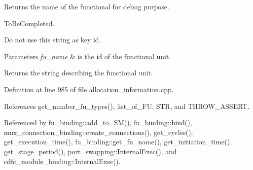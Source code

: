 Returns the name of the functional for debug purpose. 

To\+Be\+Completed.

Do not use this string as key id. 
\begin{DoxyParams}{Parameters}
{\em fu\+\_\+name} & is the id of the functional unit. \\
\hline
\end{DoxyParams}
\begin{DoxyReturn}{Returns}
the string describing the functional unit. 
\end{DoxyReturn}


Definition at line 985 of file allocation\+\_\+information.\+cpp.



References get\+\_\+number\+\_\+fu\+\_\+types(), list\+\_\+of\+\_\+\+FU, S\+TR, and T\+H\+R\+O\+W\+\_\+\+A\+S\+S\+E\+RT.



Referenced by fu\+\_\+binding\+::add\+\_\+to\+\_\+\+S\+M(), fu\+\_\+binding\+::bind(), mux\+\_\+connection\+\_\+binding\+::create\+\_\+connections(), get\+\_\+cycles(), get\+\_\+execution\+\_\+time(), fu\+\_\+binding\+::get\+\_\+fu\+\_\+name(), get\+\_\+initiation\+\_\+time(), get\+\_\+stage\+\_\+period(), port\+\_\+swapping\+::\+Internal\+Exec(), and cdfc\+\_\+module\+\_\+binding\+::\+Internal\+Exec().


